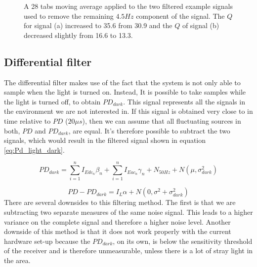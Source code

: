 \begin{figure}
	\centering     %
	\caption{A 28 tabs moving average applied to the two filtered example signals used to remove the remaining $4.5 Hz$ component of the signal. The $Q$ for signal (a) increased to 35.6 from 30.9 and the $Q$ of signal (b) decreased slightly from 16.6 to 13.3.\label{movavg_example}}
\end{figure}

\subsection{Differential filter}
The differential filter makes use of the fact that the system is not only able to sample when the light is turned on. Instead, It is possible to take samples while the light is turned off, to obtain $PD_{dark}$. This signal represents all the signals in the environment we are not interested in. If this signal is obtained very close to in time relative to $PD$ ($20\mu s$), then we can assume that all fluctuating sources in both, $PD$ and $PD_{dark}$, are equal. It's therefore possible to subtract the two signals, which would result in the filtered signal shown in equation \ref{eq:Pd_light_dark}.

\begin{equation}
\label{eq:Pd_dark}
PD_{dark} = \sum_{i=1}^n I_{Edc_{n}} \beta_{n} + \sum_{i=1}^n I_{Eac{_n}} \gamma_{n} + N_{50Hz} + N(\mu,\sigma^2_{dark})
\end{equation}

\begin{equation}
\label{eq:Pd_light_dark}
PD - PD_{dark} = I_{L} \alpha + N(0,\sigma^2 + \sigma^2_{dark})
\end{equation}
There are several downsides to this filtering method. The first is that we are subtracting two separate measures of the same noise signal. This leads to a higher variance on the complete signal and therefore a higher noise level. Another downside of this method is that it does not work properly with the current hardware set-up because the $PD_{dark}$, on its own, is below the sensitivity threshold of the receiver and is therefore unmeasurable, unless there is a lot of stray light in the area.


